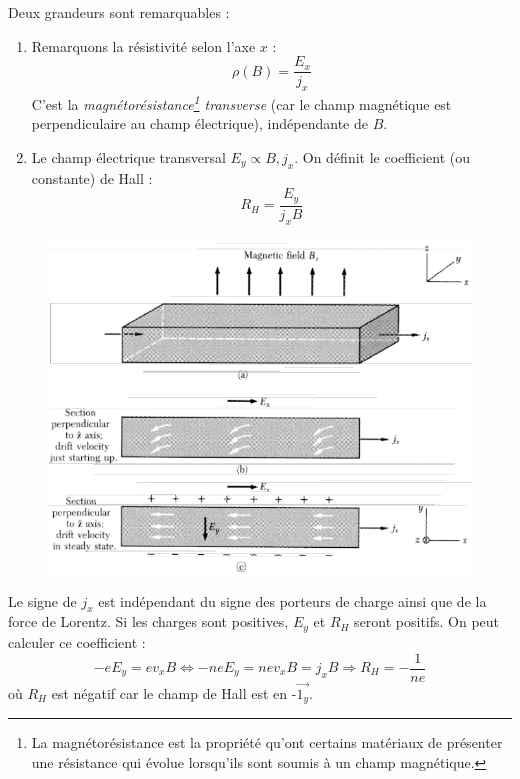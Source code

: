 Deux grandeurs sont remarquables :
\begin{enumerate}
\item Remarquons la résistivité selon l'axe $x$ :
\begin{equation}
\rho(B) = \dfrac{E_x}{j_x}
\end{equation}
C'est la \textit{magnétorésistance\footnote{La magnétorésistance est la propriété 
qu'ont certains matériaux de présenter une résistance qui évolue lorsqu'ils sont 
soumis à un champ magnétique.} transverse} (car le champ magnétique est 
perpendiculaire au champ électrique), indépendante de $B$.

\item Le champ électrique transversal $E_y \propto B, j_x$. On définit le 
coefficient (ou constante) de Hall :
\begin{equation}
R_H = \dfrac{E_y}{j_xB}
\end{equation}
\end{enumerate}

	\begin{figure}
	\vspace{-1cm}
	\includegraphics[scale=0.25]{ch1/image2.png}
	\end{figure}
Le signe de $j_x$ est indépendant du signe des porteurs de charge ainsi que de la force
de Lorentz. Si les charges sont positives, $E_y$ et $R_H$ seront positifs. On peut 
calculer ce coefficient :
\begin{equation}
-eE_y = ev_xB \Leftrightarrow -neE_y = nev_xB = j_xB \Longrightarrow R_H = -\frac{1}{ne}
\end{equation}
où $R_H$ est négatif car le champ de Hall est en -$\vec{1_y}$.